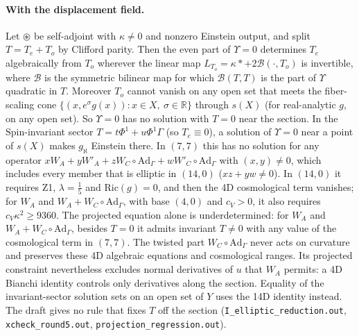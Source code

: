\documentclass[11pt]{article}
\theoremstyle{remark}
\begin{document}
\paragraph{With the displacement field.} Let $\circledast$ be self-adjoint with $\kappa\neq0$ and nonzero Einstein output, and split $T=T_e+T_o$ by Clifford parity. Then the even part of $\Upsilon=0$ determines $T_e$ algebraically from $T_o$ wherever the linear map $L_{T_o}=\kappa{*}+2\mathcal B(\cdot,T_o)$ is invertible, where $\mathcal B$ is the symmetric bilinear map for which $\mathcal B(T,T)$ is the part of $\Upsilon$ quadratic in $T$. Moreover $T_o$ cannot vanish on any open set that meets the fiber-scaling cone $\{(x,e^\sigma g(x)):x\in X,\ \sigma\in\mathbb R\}$ through $s(X)$ (for real-analytic $g$, on any open set). So $\Upsilon=0$ has no solution with $T=0$ near the section. In the $\mathrm{Spin}$-invariant sector $T=t\Phi^1+u\Phi^1\Gamma$ (so $T_e\equiv0$), a solution of $\Upsilon=0$ near a point of $s(X)$ makes $g_\aleph$ Einstein there. In $(7,7)$ this has no solution for any operator $xW_A+yW'_A+zW_C\circ\mathrm{Ad}_\Gamma+wW'_C\circ\mathrm{Ad}_\Gamma$ with $(x,y)\neq0$, which includes every member that is elliptic in $(14,0)$ ($xz+yw\neq0$). In $(14,0)$ it requires Z1, $\lambda=\tfrac15$ and $\mathrm{Ric}(g)=0$, and then the 4D cosmological term vanishes; for $W_A$ and $W_A+W_C\circ\mathrm{Ad}_\Gamma$, with base $(4,0)$ and $c_V>0$, it also requires $c_V\kappa^2\ge9360$. The projected equation alone is underdetermined: for $W_A$ and $W_A+W_C\circ\mathrm{Ad}_\Gamma$, besides $T=0$ it admits invariant $T\neq0$ with any value of the cosmological term in $(7,7)$. The twisted part $W_C\circ\mathrm{Ad}_\Gamma$ never acts on curvature and preserves these 4D algebraic equations and cosmological ranges. Its projected constraint nevertheless excludes normal derivatives of $u$ that $W_A$ permits: a 4D Bianchi identity controls only derivatives along the section. Equality of the invariant-sector solution sets on an open set of $Y$ uses the 14D identity instead. The draft gives no rule that fixes $T$ off the section (\texttt{I\_elliptic\_reduction.out}, \texttt{xcheck\_round5.out}, \texttt{projection\_regression.out}).
\end{document}
